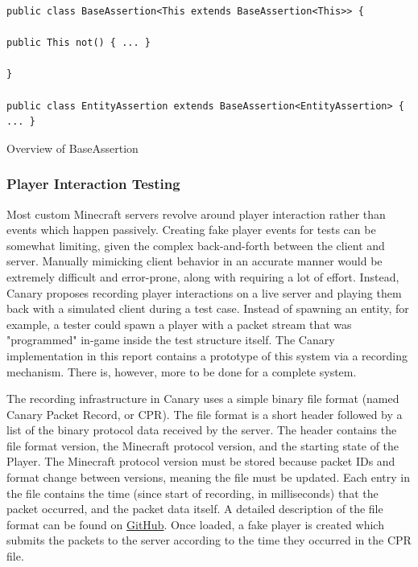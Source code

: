 \documentclass[12pt]{article}
\begin{document}
\begin{onehalfspacing}
\begin{listing}[H]
\begin{verbatim}
public class BaseAssertion<This extends BaseAssertion<This>> {

public This not() { ... }

}

public class EntityAssertion extends BaseAssertion<EntityAssertion> { ... }

\end{verbatim}
\caption{Overview of BaseAssertion}
\label{lst:4_2_2_2}
\end{listing}

\subsubsection{Player Interaction Testing}

Most custom Minecraft servers revolve around player interaction rather
than events which happen passively. Creating fake player events for
tests can be somewhat limiting, given the complex back-and-forth between
the client and server. Manually mimicking client behavior in an accurate
manner would be extremely difficult and error-prone, along with
requiring a lot of effort. Instead, Canary proposes recording player
interactions on a live server and playing them back with a simulated
client during a test case. Instead of spawning an entity, for example, a
tester could spawn a player with a packet stream that was "programmed"
in-game inside the test structure itself. The Canary implementation in
this report contains a prototype of this system via a recording
mechanism. There is, however, more to be done for a complete system.

The recording infrastructure in Canary uses a simple binary file format
(named Canary Packet Record, or CPR). The file format is a short header
followed by a list of the binary protocol data received by the server.
The header contains the file format version, the Minecraft protocol
version, and the starting state of the Player. The Minecraft protocol
version must be stored because packet IDs and format change between
versions, meaning the file must be updated. Each entry in the file
contains the time (since start of recording, in milliseconds) that the
packet occurred, and the packet data itself. A detailed description of
the file format can be found on
\href{https://gist.github.com/mworzala/13abec46e1114bde479cb0c9e7e8d888}{{GitHub}}.
Once loaded, a fake player is created which submits the packets to the
server according to the time they occurred in the CPR file.


\end{onehalfspacing}
\end{document}
